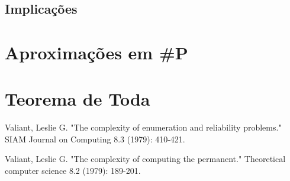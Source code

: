 \documentclass[paper=a4, fontsize=11pt]{scrartcl} %
\numberwithin{figure}{section} %
\newcommand{\SP}{\textbf{\#P}\xspace}
\begin{document}
\subsection{Implicações}

\pagebreak
\section{Aproximações em \SP}

\pagebreak
\section{Teorema de Toda}


\pagebreak
\begin{thebibliography}{1}

 Valiant, Leslie G. "The complexity of enumeration and reliability problems." SIAM Journal on Computing 8.3 (1979): 410-421.

 Valiant, Leslie G. "The complexity of computing the permanent." Theoretical computer science 8.2 (1979): 189-201.

\end{thebibliography}
\end{document}
